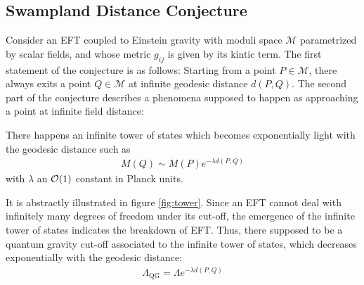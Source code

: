 \subsection{Swampland Distance Conjecture}
Consider an EFT coupled to Einstein gravity with moduli space $\mathcal{M}$ parametrized by scalar fields, and whose metric $g_{ij}$ is given by its kintic term. The first statement of the conjecture is as follows: Starting from a point $P \in \mathcal{M}$, there always exits a point $Q \in \mathcal{M}$ at infinite geodesic distance $d(P,Q)$. The second part of the conjecture describes a phenomena supposed to happen as approaching a point at infinite field distance:
\begin{tcolorbox}[title=Swampland Distance Conjecture,
    title filled=false,
    colback=blue!5!white,
    colframe=blue!75!black]
    There happens an infinite tower of states which becomes exponentially light with the geodesic distance such as 
    \begin{align}
        M(Q) \sim M(P) e^{-\lambda d(P,Q)}
    \end{align}
    with $\lambda$ an $\order*{1}$ constant in Planck units. 
\end{tcolorbox}
It is abstractly illustrated in figure \ref{fig:tower}. Since an EFT cannot deal with infinitely many degrees of freedom under its cut-off, the emergence of the infinite tower of states indicates the breakdown of EFT. Thus, there supposed to be a quantum gravity cut-off associated to the infinite tower of states, which decreases exponentially with the geodesic distance:
\begin{align}
    \Lambda _{\text{QG}} = \Lambda e^{-\lambda d(P,Q)}
\end{align}
